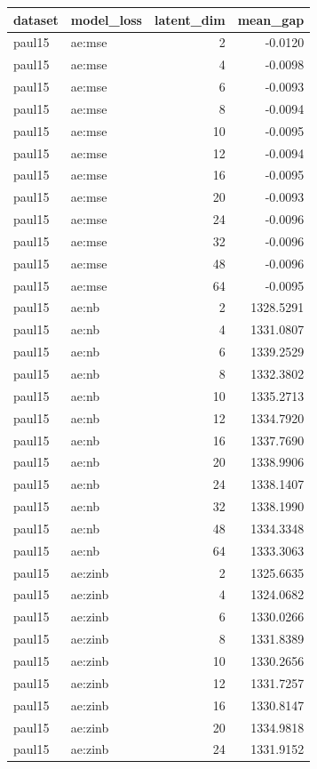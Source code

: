 \begin{tabular}{llrr}
\toprule
dataset & model\_loss & latent\_dim & mean\_gap \\
\midrule
paul15 & ae:mse & 2 & -0.0120 \\
paul15 & ae:mse & 4 & -0.0098 \\
paul15 & ae:mse & 6 & -0.0093 \\
paul15 & ae:mse & 8 & -0.0094 \\
paul15 & ae:mse & 10 & -0.0095 \\
paul15 & ae:mse & 12 & -0.0094 \\
paul15 & ae:mse & 16 & -0.0095 \\
paul15 & ae:mse & 20 & -0.0093 \\
paul15 & ae:mse & 24 & -0.0096 \\
paul15 & ae:mse & 32 & -0.0096 \\
paul15 & ae:mse & 48 & -0.0096 \\
paul15 & ae:mse & 64 & -0.0095 \\
paul15 & ae:nb & 2 & 1328.5291 \\
paul15 & ae:nb & 4 & 1331.0807 \\
paul15 & ae:nb & 6 & 1339.2529 \\
paul15 & ae:nb & 8 & 1332.3802 \\
paul15 & ae:nb & 10 & 1335.2713 \\
paul15 & ae:nb & 12 & 1334.7920 \\
paul15 & ae:nb & 16 & 1337.7690 \\
paul15 & ae:nb & 20 & 1338.9906 \\
paul15 & ae:nb & 24 & 1338.1407 \\
paul15 & ae:nb & 32 & 1338.1990 \\
paul15 & ae:nb & 48 & 1334.3348 \\
paul15 & ae:nb & 64 & 1333.3063 \\
paul15 & ae:zinb & 2 & 1325.6635 \\
paul15 & ae:zinb & 4 & 1324.0682 \\
paul15 & ae:zinb & 6 & 1330.0266 \\
paul15 & ae:zinb & 8 & 1331.8389 \\
paul15 & ae:zinb & 10 & 1330.2656 \\
paul15 & ae:zinb & 12 & 1331.7257 \\
paul15 & ae:zinb & 16 & 1330.8147 \\
paul15 & ae:zinb & 20 & 1334.9818 \\
paul15 & ae:zinb & 24 & 1331.9152 \\

\end{tabular}
